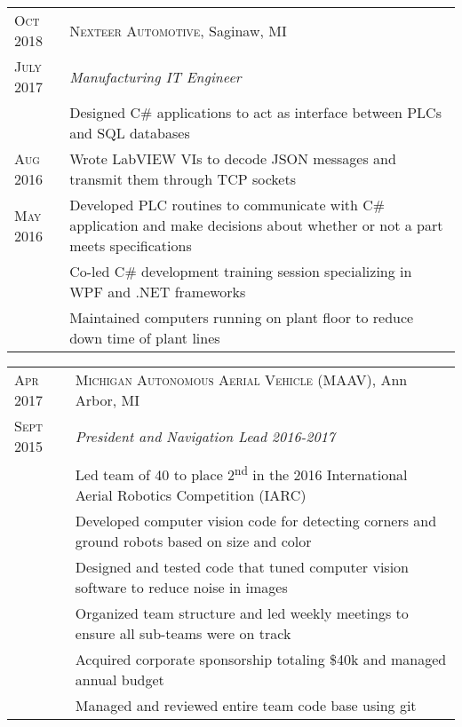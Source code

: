 \documentclass[a4paper,12pt]{article} %
\begin{document}

\begin{tabular}{R{2.1cm}|p{15.5cm}}
\textsc{Oct 2018} & \textsc{Nexteer Automotive}, Saginaw, MI \\
\textsc{July 2017} & \emph{Manufacturing IT Engineer} \\
& \footnotesize{Designed C\# applications to act as interface
  between PLCs and SQL databases} \\
\textsc{Aug 2016} & \footnotesize{Wrote LabVIEW VIs to decode JSON messages
  and transmit them through TCP sockets}\\
\textsc{May 2016} & \footnotesize{Developed PLC routines to communicate with C\#
  application and make decisions about whether or not a part meets
  specifications} \\
& \footnotesize{Co-led C\# development training session specializing in WPF and
 .NET frameworks}\\
& \footnotesize{Maintained computers running on plant floor to reduce down time
  of plant lines} \\
\end{tabular}


\begin{tabular}{R{2.1cm}|p{15.5cm}}
\textsc{Apr 2017} & \textsc{Michigan Autonomous Aerial Vehicle (MAAV)},
  Ann Arbor, MI\\
\textsc{Sept 2015} & \emph{President and Navigation Lead 2016-2017} \\
& \footnotesize{Led team of 40 to place 2\textsuperscript{nd} in the 2016
  International Aerial Robotics Competition (IARC)} \\
& \footnotesize{Developed computer vision code for detecting corners and
  ground robots based on size and color} \\
& \footnotesize{Designed and tested code that tuned computer vision software to
  reduce noise in images} \\
& \footnotesize{Organized team structure and led weekly meetings to ensure all
  sub-teams were on track} \\
& \footnotesize{Acquired corporate sponsorship totaling \$40k and managed annual
  budget} \\
& \footnotesize{Managed and reviewed entire team code base using git} \\
\end{tabular}
\end{document}
